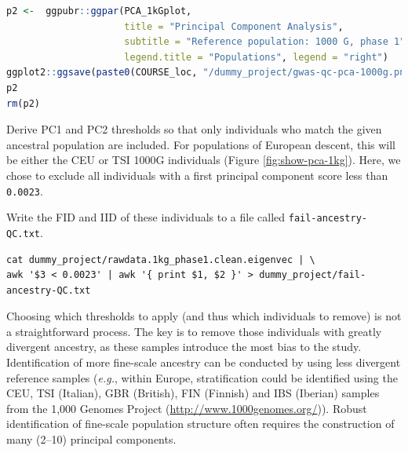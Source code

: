 \documentclass[
]{book}
\newcommand{\passthrough}[1]{#1}
\begin{document}
\begin{lstlisting}[language=R]
p2 <-  ggpubr::ggpar(PCA_1kGplot,
                     title = "Principal Component Analysis",
                     subtitle = "Reference population: 1000 G, phase 1",
                     legend.title = "Populations", legend = "right")
ggplot2::ggsave(paste0(COURSE_loc, "/dummy_project/gwas-qc-pca-1000g.png"), plot = p2)
p2
rm(p2)
\end{lstlisting}

Derive PC1 and PC2 thresholds so that only individuals who match the given ancestral population are included. For populations of European descent, this will be either the CEU or TSI 1000G individuals (Figure \ref{fig:show-pca-1kg}). Here, we chose to exclude all individuals with a first principal component score less than \passthrough{\lstinline!0.0023!}.

Write the FID and IID of these individuals to a file called \passthrough{\lstinline!fail-ancestry-QC.txt!}.

\begin{lstlisting}
cat dummy_project/rawdata.1kg_phase1.clean.eigenvec | \
awk '$3 < 0.0023' | awk '{ print $1, $2 }' > dummy_project/fail-ancestry-QC.txt
\end{lstlisting}

Choosing which thresholds to apply (and thus which individuals to remove) is not a straightforward process. The key is to remove those individuals with greatly divergent ancestry, as these samples introduce the most bias to the study. Identification of more fine-scale ancestry can be conducted by using less divergent reference samples (\emph{e.g.}, within Europe, stratification could be identified using the CEU, TSI (Italian), GBR (British), FIN (Finnish) and IBS (Iberian) samples from the 1,000 Genomes Project (\url{http://www.1000genomes.org/})). Robust identification of fine-scale population structure often requires the construction of many (2--10) principal components.
\end{document}
